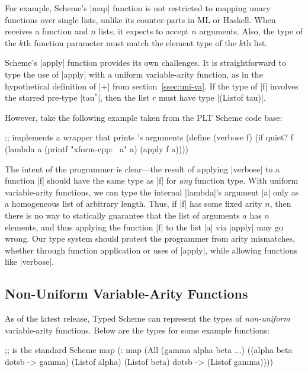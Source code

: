 \begin{schemeregion}
For example, Scheme's \scheme|map| function
is not restricted to mapping unary functions over single lists,
 unlike its counter-parts in ML or Haskell. When
 receives a function  and $n$ lists, it expects
 to accept $n$ arguments.  Also, the type of the $k$th function
parameter must match the element type of the $k$th list.

 Scheme's \scheme|apply| function provides its own
challenges.  It is straightforward to type the use of \scheme|apply|
with a uniform variable-arity function, as in the hypothetical
definition of \scheme|+| from section~\ref{ssec:uni-va}.  If the type
of \scheme|f| involves the starred pre-type \scheme|tau$^*$|, then the
list $r$ must have type \scheme|(Listof tau)|.

However, take the following example taken from the PLT Scheme code base:
\begin{schemedisplay}
;; implements a wrapper that prints 's arguments
(define (verbose f)
  (if quiet? f (lambda a (printf "xform-cpp: ~a\n" a) (apply f a))))
\end{schemedisplay}
The intent of the programmer is clear---the result of applying
\scheme|verbose| to a function \scheme|f| should have the same type as
\scheme|f| for {\em any} function type.  With uniform
variable-arity functions, we can type the internal \scheme|lambda|'s
argument \scheme|a| only as a homogeneous list of arbitrary length.
Thus, if \scheme|f| has some fixed arity $n$, then there is no way to
statically guarantee that the list of arguments $a$ has $n$ elements,
and thus applying the function \scheme|f| to the list \scheme|a| via
\scheme|apply| may go wrong.  Our type system should protect the
programmer from arity mismatches, whether through function application
or uses of \scheme|apply|, while allowing functions like \scheme|verbose|.

\subsection{Non-Uniform Variable-Arity Functions}

As of the latest release, Typed Scheme can represent the types of \emph{non-uniform} variable-arity
functions.  Below are the types for some example functions:
\begin{schemedisplay}
;;  is the standard Scheme map
(: map 
   (All (gamma alpha beta ...) 
     ((alpha beta dotsb -> gamma) (Listof alpha) (Listof beta) dotsb -> (Listof gamma))))


\end{schemedisplay}
\end{schemeregion}
